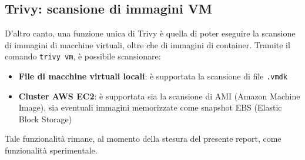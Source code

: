 \subsection{Trivy: scansione di immagini VM}
D'altro canto, una funzione unica di Trivy è quella di poter eseguire la scansione di immagini di macchine virtuali, oltre che di immagini di container. Tramite il comando \texttt{trivy vm}, è possibile scansionare:
\begin{itemize}
   \item\textbf{File di macchine virtuali locali}: è supportata la scansione di file \texttt{.vmdk}
   \item\textbf{Cluster AWS EC2}: è supportata sia la scansione di AMI (Amazon Machine Image), sia eventuali immagini memorizzate come snapshot EBS (Elastic Block Storage)
\end{itemize}
Tale funzionalità rimane, al momento della stesura del presente report, come funzionalità sperimentale.